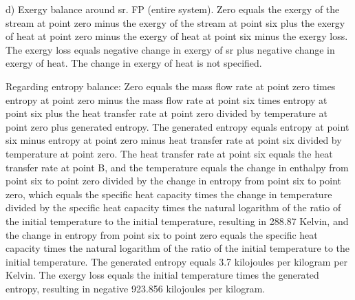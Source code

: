 d) Exergy balance around sr. FP (entire system).
Zero equals the exergy of the stream at point zero minus the exergy of the stream at point six plus the exergy of heat at point zero minus the exergy of heat at point six minus the exergy loss.
The exergy loss equals negative change in exergy of sr plus negative change in exergy of heat.
The change in exergy of heat is not specified.

Regarding entropy balance:
Zero equals the mass flow rate at point zero times entropy at point zero minus the mass flow rate at point six times entropy at point six plus the heat transfer rate at point zero divided by temperature at point zero plus generated entropy.
The generated entropy equals entropy at point six minus entropy at point zero minus heat transfer rate at point six divided by temperature at point zero.
The heat transfer rate at point six equals the heat transfer rate at point B, and the temperature equals the change in enthalpy from point six to point zero divided by the change in entropy from point six to point zero, which equals the specific heat capacity times the change in temperature divided by the specific heat capacity times the natural logarithm of the ratio of the initial temperature to the initial temperature, resulting in 288.87 Kelvin, and the change in entropy from point six to point zero equals the specific heat capacity times the natural logarithm of the ratio of the initial temperature to the initial temperature.
The generated entropy equals 3.7 kilojoules per kilogram per Kelvin.
The exergy loss equals the initial temperature times the generated entropy, resulting in negative 923.856 kilojoules per kilogram.